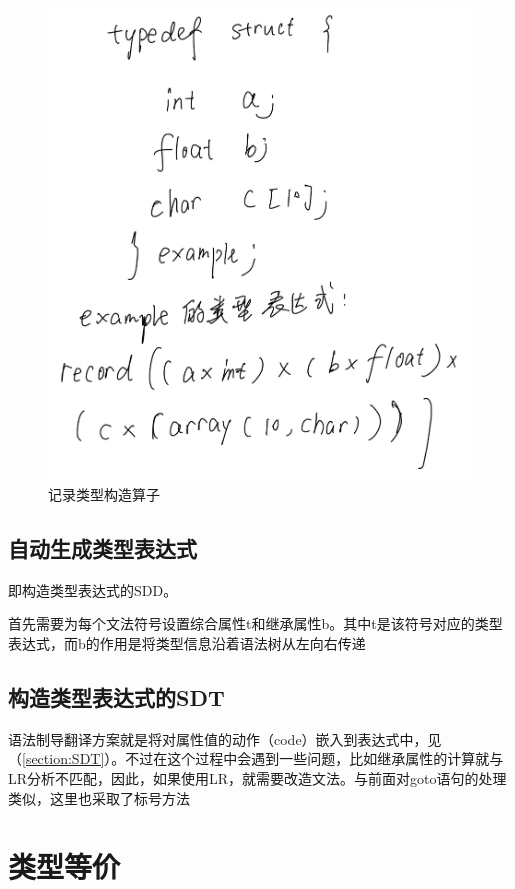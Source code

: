 \documentclass[]{report}
\begin{document}
		\begin{figure}[h]
			\centering
			\begin{minipage}{40em}
				\centering
				\includegraphics[scale = 0.2]{images/struct_type.PNG}
			\end{minipage}
			\caption{记录类型构造算子}
		\end{figure}
		\subsection{自动生成类型表达式}
			即构造类型表达式的SDD。\par
			首先需要为每个文法符号设置综合属性t和继承属性b。其中t是该符号对应的类型表达式，而b的作用是将类型信息沿着语法树从左向右传递
		\subsection{构造类型表达式的SDT}
			语法制导翻译方案就是将对属性值的动作（code）嵌入到表达式中，见（\ref{section:SDT}）。不过在这个过程中会遇到一些问题，比如继承属性的计算就与LR分析不匹配，因此，如果使用LR，就需要改造文法。与前面对goto语句的处理类似，这里也采取了标号方法
	\section{类型等价}
\end{document}

